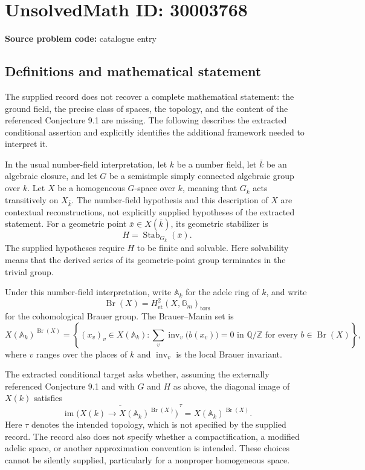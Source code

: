 \documentclass[11pt]{article}
\newcommand{\Z}{\mathbb{Z}}
\newcommand{\Q}{\mathbb{Q}}
\newcommand{\A}{\mathbb{A}}
\begin{document}
\section*{UnsolvedMath ID: 30003768}
\textbf{Source problem code:} catalogue entry
\subsection{Definitions and mathematical statement}
The supplied record does not recover a complete mathematical statement: the ground field, the precise class of spaces, the topology, and the content of the referenced Conjecture 9.1 are missing. The following describes the extracted conditional assertion and explicitly identifies the additional framework needed to interpret it.

In the usual number-field interpretation, let \(k\) be a number field, let \(\bar{k}\) be an algebraic closure, and let \(G\) be a semisimple simply connected algebraic group over \(k\). Let \(X\) be a homogeneous \(G\)-space over \(k\), meaning that \(G_{\bar{k}}\) acts transitively on \(X_{\bar{k}}\). The number-field hypothesis and this description of \(X\) are contextual reconstructions, not explicitly supplied hypotheses of the extracted statement. For a geometric point \(\bar{x}\in X(\bar{k})\), its geometric stabilizer is
\[
H=\operatorname{Stab}_{G_{\bar{k}}}(\bar{x}).
\]
The supplied hypotheses require \(H\) to be finite and solvable. Here solvability means that the derived series of its geometric-point group terminates in the trivial group.

Under this number-field interpretation, write \(\A_k\) for the adele ring of \(k\), and write
\[
\operatorname{Br}(X)=H^2_{\mathrm{\acute{e}t}}(X,\mathbb G_m)_{\mathrm{tors}}
\]
for the cohomological Brauer group. The Brauer--Manin set is
\[
X(\A_k)^{\operatorname{Br}(X)}
=\left\{(x_v)_v\in X(\A_k):
\sum_v\operatorname{inv}_v\bigl(b(x_v)\bigr)=0\text{ in }\Q/\Z
\text{ for every }b\in\operatorname{Br}(X)\right\},
\]
where \(v\) ranges over the places of \(k\) and \(\operatorname{inv}_v\) is the local Brauer invariant.

The extracted conditional target asks whether, assuming the externally referenced Conjecture 9.1 and with \(G\) and \(H\) as above, the diagonal image of \(X(k)\) satisfies
\[
\overline{\operatorname{im}\bigl(X(k)\longrightarrow X(\A_k)^{\operatorname{Br}(X)}\bigr)}^{\,\tau}
=X(\A_k)^{\operatorname{Br}(X)}.
\]
Here \(\tau\) denotes the intended topology, which is not specified by the supplied record. The record also does not specify whether a compactification, a modified adelic space, or another approximation convention is intended. These choices cannot be silently supplied, particularly for a nonproper homogeneous space.
\end{document}
